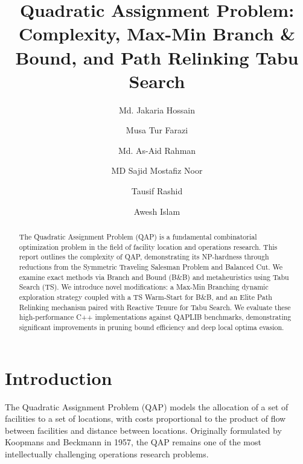 \documentclass[sigconf,nonacm]{acmart}
\begin{document}
\title{Quadratic Assignment Problem: Complexity, Max-Min Branch \& Bound, and Path Relinking Tabu Search}

\author{Md. Jakaria Hossain}

\author{Musa Tur Farazi}

\author{Md. As-Aid Rahman}

\author{MD Sajid Mostafiz Noor}

\author{Tausif Rashid}

\author{Awesh Islam}

\begin{abstract}
The Quadratic Assignment Problem (QAP) is a fundamental combinatorial optimization problem in the field of facility location and operations research. This report outlines the complexity of QAP, demonstrating its NP-hardness through reductions from the Symmetric Traveling Salesman Problem and Balanced Cut. We examine exact methods via Branch and Bound (B\&B) and metaheuristics using Tabu Search (TS). We introduce novel modifications: a Max-Min Branching dynamic exploration strategy coupled with a TS Warm-Start for B\&B, and an Elite Path Relinking mechanism paired with Reactive Tenure for Tabu Search. We evaluate these high-performance C++ implementations against QAPLIB benchmarks, demonstrating significant improvements in pruning bound efficiency and deep local optima evasion.
\end{abstract}


\maketitle

\section{Introduction}
The Quadratic Assignment Problem (QAP) models the allocation of a set of facilities to a set of locations, with costs proportional to the product of flow between facilities and distance between locations. Originally formulated by Koopmans and Beckmann in 1957, the QAP remains one of the most intellectually challenging operations research problems.
\end{document}
